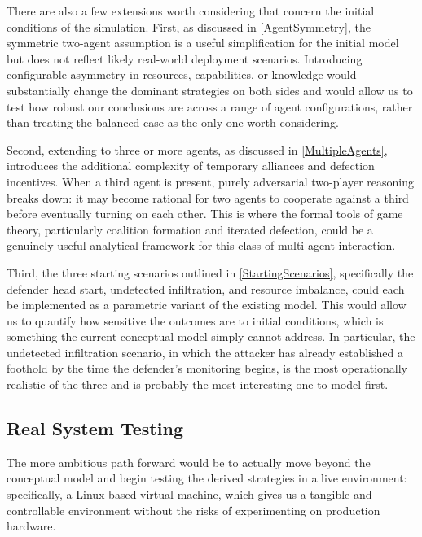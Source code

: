 There are also a few extensions worth considering that concern the initial conditions of the simulation. First, as discussed in \autoref{AgentSymmetry}, the symmetric two-agent assumption is a useful simplification for the initial model but does not reflect likely real-world deployment scenarios. Introducing configurable asymmetry in resources, capabilities, or knowledge would substantially change the dominant strategies on both sides and would allow us to test how robust our conclusions are across a range of agent configurations, rather than treating the balanced case as the only one worth considering.

Second, extending to three or more agents, as discussed in \autoref{MultipleAgents}, introduces the additional complexity of temporary alliances and defection incentives. When a third agent is present, purely adversarial two-player reasoning breaks down: it may become rational for two agents to cooperate against a third before eventually turning on each other. This is where the formal tools of game theory, particularly coalition formation and iterated defection, could be a genuinely useful analytical framework for this class of multi-agent interaction.

Third, the three starting scenarios outlined in \autoref{StartingScenarios}, specifically the defender head start, undetected infiltration, and resource imbalance, could each be implemented as a parametric variant of the existing model. This would allow us to quantify how sensitive the outcomes are to initial conditions, which is something the current conceptual model simply cannot address. In particular, the undetected infiltration scenario, in which the attacker has already established a foothold by the time the defender's monitoring begins, is the most operationally realistic of the three and is probably the most interesting one to model first.

\subsection{Real System Testing}
\label{RealSystemTesting}

The more ambitious path forward would be to actually move beyond the conceptual model and begin testing the derived strategies in a live environment: specifically, a Linux-based virtual machine, which gives us a tangible and controllable environment without the risks of experimenting on production hardware.

